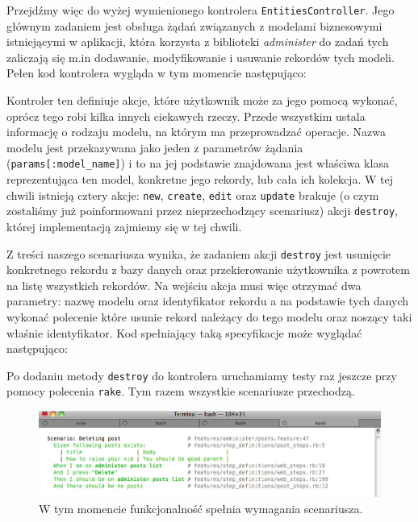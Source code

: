   Przejdźmy więc do wyżej wymienionego kontrolera \texttt{EntitiesController}. Jego głównym zadaniem jest obsługa żądań związanych z modelami biznesowymi istniejącymi w aplikacji, która korzysta z biblioteki \emph{administer} do zadań tych zaliczają się m.in dodawanie, modyfikowanie i usuwanie rekordów tych modeli. Pełen kod kontrolera wygląda w tym momencie następująco:
  
  
  
  Kontroler ten definiuje akcje, które użytkownik może za jego pomocą wykonać, oprócz tego robi kilka innych ciekawych rzeczy. Przede wszystkim ustala informację o rodzaju modelu, na którym ma przeprowadzać operacje. Nazwa modelu jest przekazywana jako jeden z parametrów żądania (\verb+params[:model_name]+) i to na jej podstawie znajdowana jest właściwa klasa reprezentująca ten model, konkretne jego rekordy, lub cała ich kolekcja.
  W tej chwili istnieją cztery akcje: \texttt{new}, \texttt{create}, \texttt{edit} oraz \texttt{update} brakuje (o czym zostaliśmy już poinformowani przez nieprzechodzący scenariusz) akcji \texttt{destroy}, której implementacją zajmiemy się w tej chwili.
  
  Z treści naszego scenariusza wynika, że zadaniem akcji \texttt{destroy} jest usunięcie konkretnego rekordu z bazy danych oraz przekierowanie użytkownika z powrotem na listę wszystkich rekordów. Na wejściu akcja musi więc otrzymać dwa parametry: nazwę modelu oraz identyfikator rekordu a na podstawie tych danych wykonać polecenie które usunie rekord należący do tego modelu oraz noszący taki właśnie identyfikator. Kod spełniający taką specyfikacje może wyglądać następująco: 
  
  
  
  Po dodaniu metody \texttt{destroy} do kontrolera uruchamiamy testy raz jeszcze przy pomocy polecenia \texttt{rake}. Tym razem wszystkie scenariusze przechodzą.
  
  \clearpage
  
   \begin{figure}[!h]
 		\begin{center}
 			\includegraphics[width=\linewidth]{images/delete_record_scenario_pass.png}
 			\caption{W tym momencie funkcjonalność spełnia wymagania scenariusza.}
 			\label{delete_record_scenario_pass}
 		\end{center}
 	\end{figure}
 	
